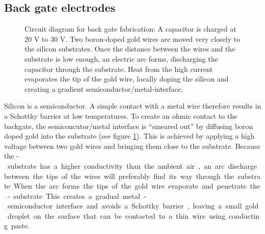 \subsection{Back gate electrodes}

\begin{figure}
	\centering
	\caption{Circuit diagram for back gate fabrication: A capacitor is charged at 20 V to 30 V. Two boron-doped gold wires are moved very closely to the silicon substrates. Once the distance between the wires and the substrate is low enough, an electric arc forms, discharging the capacitor through the substrate. Heat from the high current evaporates the tip of the gold wire, locally doping the silicon and creating a gradient semiconductor/metal-interface.}\label{arc}
\end{figure}

Silicon is a semiconductor. A simple contact with a metal wire therefore results in a Schottky barrier at low temperatures. To create an ohmic contact to the backgate, the semiconcutor/metal interface is ``smeared out'' by diffusing boron doped gold into the substrate (see figure \ref{arc}). This is achieved by applying a high voltage between two gold wires and bringing them close to the substrate. Because the \si-substrate has a higher conductivity than the ambient air, an arc discharge between the tips of the wires will preferably find its way through the substrate. When the arc forms the tips of the gold wire evaporate and penetrate the \si-substrate. This creates a gradual metal-semiconductor interface and avoids a Schottky barrier, leaving a small gold droplet on the surface that can be contacted to a thin wire using conducting paste.

